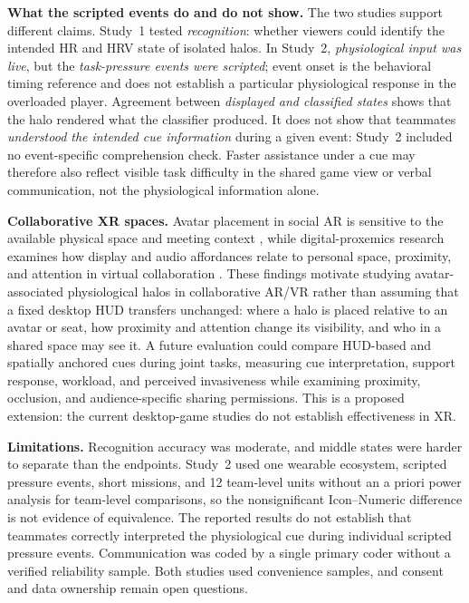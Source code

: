 \documentclass[sigconf]{acmart}
\begin{document}
\textbf{What the scripted events do and do not show.}\label{sec:scope} The two studies support different claims. Study~1 tested \emph{recognition}: whether viewers could identify the intended HR and HRV state of isolated halos. In Study~2, \emph{physiological input was live}, but the \emph{task-pressure events were scripted}; event onset is the behavioral timing reference and does not establish a particular physiological response in the overloaded player. Agreement between \emph{displayed and classified states} shows that the halo rendered what the classifier produced. It does not show that teammates \emph{understood the intended cue information} during a given event: Study~2 included no event-specific comprehension check. Faster assistance under a cue may therefore also reflect visible task difficulty in the shared game view or verbal communication, not the physiological information alone.

\textbf{Collaborative XR spaces.} Avatar placement in social AR is sensitive to the available physical space and meeting context \cite{drago_exploring_2025}, while digital-proxemics research examines how display and audio affordances relate to personal space, proximity, and attention in virtual collaboration \cite{williamson_digital_2022}. These findings motivate studying avatar-associated physiological halos in collaborative AR/VR rather than assuming that a fixed desktop HUD transfers unchanged: where a halo is placed relative to an avatar or seat, how proximity and attention change its visibility, and who in a shared space may see it. A future evaluation could compare HUD-based and spatially anchored cues during joint tasks, measuring cue interpretation, support response, workload, and perceived invasiveness while examining proximity, occlusion, and audience-specific sharing permissions. This is a proposed extension: the current desktop-game studies do not establish effectiveness in XR.

\textbf{Limitations.} Recognition accuracy was moderate, and middle states were harder to separate than the endpoints. Study~2 used one wearable ecosystem, scripted pressure events, short missions, and 12 team-level units without an a priori power analysis for team-level comparisons, so the nonsignificant Icon--Numeric difference is not evidence of equivalence. The reported results do not establish that teammates correctly interpreted the physiological cue during individual scripted pressure events. Communication was coded by a single primary coder without a verified reliability sample. Both studies used convenience samples, and consent and data ownership remain open questions.
\end{document}
